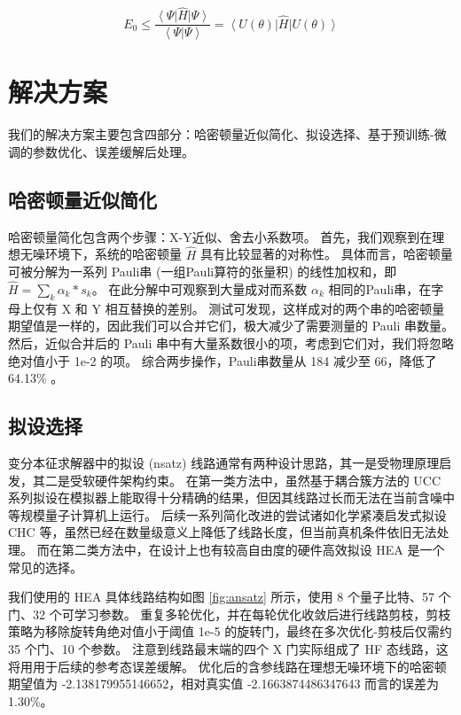 \documentclass[withoutpreface,bwprint]{cumcmthesis}
\begin{document}
\begin{equation}
E_0 \le \frac{\left< \Psi  \right| \hat H \left| \Psi \right>}{\left< \Psi | \Psi \right>} = \left< U(\theta)  \right| \hat H \left| U(\theta) \right>
\label{eq:rr-method}
\end{equation}


\section{解决方案}

我们的解决方案主要包含四部分：哈密顿量近似简化、拟设选择、基于预训练-微调的参数优化、误差缓解后处理。

\subsection{哈密顿量近似简化}

哈密顿量简化包含两个步骤：X-Y近似、舍去小系数项。
首先，我们观察到在理想无噪环境下，系统的哈密顿量 $ \hat H $ 具有比较显著的对称性。
具体而言，哈密顿量可被分解为一系列 Pauli串 (一组Pauli算符的张量积) 的线性加权和，即 $ \hat H = \sum_k \alpha_k * s_k $。
在此分解中可观察到大量成对而系数 $ \alpha_k $ 相同的Pauli串，在字母上仅有 X 和 Y 相互替换的差别。
测试可发现，这样成对的两个串的哈密顿量期望值是一样的，因此我们可以合并它们，极大减少了需要测量的 Pauli 串数量。
然后，近似合并后的 Pauli 串中有大量系数很小的项，考虑到它们对，我们将忽略绝对值小于 1e-2 的项。
综合两步操作，Pauli串数量从 184 减少至 66，降低了 64.13\% 。

\subsection{拟设选择}

变分本征求解器中的拟设 (nsatz) 线路通常有两种设计思路，其一是受物理原理启发，其二是受软硬件架构约束。
在第一类方法中，虽然基于耦合簇方法的 UCC \cite{UCC2017} 系列拟设在模拟器上能取得十分精确的结果，但因其线路过长而无法在当前含噪中等规模量子计算机上运行。
后续一系列简化改进的尝试诸如化学紧凑启发式拟设 CHC \cite{CHC2020} 等，虽然已经在数量级意义上降低了线路长度，但当前真机条件依旧无法处理。
而在第二类方法中，在设计上也有较高自由度的硬件高效拟设 HEA \cite{HEA2017} 是一个常见的选择。

我们使用的 HEA 具体线路结构如图 \ref{fig:ansatz} 所示，使用 8 个量子比特、57 个门、32 个可学习参数。
重复多轮优化，并在每轮优化收敛后进行线路剪枝，剪枝策略为移除旋转角绝对值小于阈值 1e-5 的旋转门，最终在多次优化-剪枝后仅需约 35 个门、10 个参数。
注意到线路最末端的四个 X 门实际组成了 HF 态线路，这将用用于后续的参考态误差缓解。
优化后的含参线路在理想无噪环境下的哈密顿期望值为 -2.138179955146652，相对真实值 -2.1663874486347643 而言的误差为 1.30\%。
\end{document}
